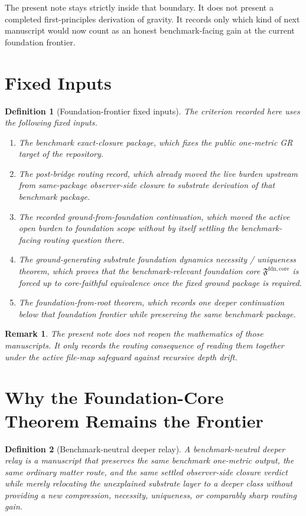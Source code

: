 \documentclass[11pt]{article}
\newcommand{\FoundationCore}{\mathfrak F^{\mathrm{fdn,core}}}
\newtheorem{definition}{Definition}
\newtheorem{remark}{Remark}
\begin{document}
The present note stays strictly inside that boundary. It does not present a completed first-principles derivation of gravity. It records only which kind of next manuscript would now count as an honest benchmark-facing gain at the current foundation frontier.

\section{Fixed Inputs}

\begin{definition}[Foundation-frontier fixed inputs]
The criterion recorded here uses the following fixed inputs.
\begin{enumerate}
    \item The benchmark exact-closure package, which fixes the public one-metric GR target of the repository.
    \item The post-bridge routing record, which already moved the live burden upstream from same-package observer-side closure to substrate derivation of that benchmark package.
    \item The recorded ground-from-foundation continuation, which moved the active open burden to foundation scope without by itself settling the benchmark-facing routing question there.
    \item The ground-generating substrate foundation dynamics necessity / uniqueness theorem, which proves that the benchmark-relevant foundation core \(\FoundationCore\) is forced up to core-faithful equivalence once the fixed ground package is required.
    \item The foundation-from-root theorem, which records one deeper continuation below that foundation frontier while preserving the same benchmark package.
\end{enumerate}
\end{definition}

\begin{remark}
The present note does not reopen the mathematics of those manuscripts. It only records the routing consequence of reading them together under the active file-map safeguard against recursive depth drift.
\end{remark}

\section{Why the Foundation-Core Theorem Remains the Frontier}

\begin{definition}[Benchmark-neutral deeper relay]
A \emph{benchmark-neutral deeper relay} is a manuscript that preserves the same benchmark one-metric output, the same ordinary matter route, and the same settled observer-side closure verdict while merely relocating the unexplained substrate layer to a deeper class without providing a new compression, necessity, uniqueness, or comparably sharp routing gain.
\end{definition}
\end{document}
